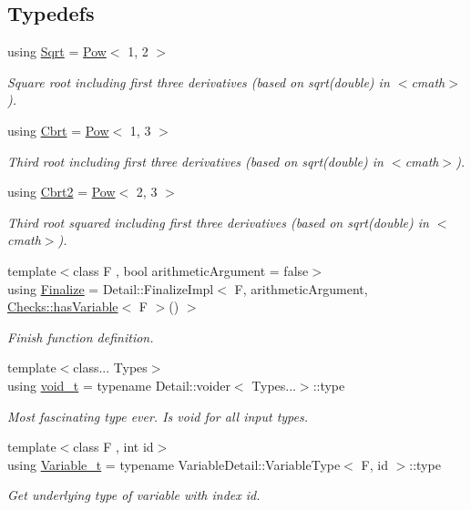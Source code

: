 \subsection*{Typedefs}
\begin{DoxyCompactItemize}
\item 
using \hyperlink{group__CMathGroup_gaca80e773d5886f47cd49dc19b130263f}{Sqrt} = \hyperlink{structFunG_1_1Pow}{Pow}$<$ 1, 2 $>$
\begin{DoxyCompactList}\small\item\em Square root including first three derivatives (based on sqrt(double) in $<$cmath$>$). \end{DoxyCompactList}\item 
using \hyperlink{group__CMathGroup_ga2e4363ad8400e1c8431c10de2152ec2b}{Cbrt} = \hyperlink{structFunG_1_1Pow}{Pow}$<$ 1, 3 $>$
\begin{DoxyCompactList}\small\item\em Third root including first three derivatives (based on sqrt(double) in $<$cmath$>$). \end{DoxyCompactList}\item 
using \hyperlink{group__CMathGroup_ga9bcbef859d7ffd0d6570d69e1bd8503a}{Cbrt2} = \hyperlink{structFunG_1_1Pow}{Pow}$<$ 2, 3 $>$
\begin{DoxyCompactList}\small\item\em Third root squared including first three derivatives (based on sqrt(double) in $<$cmath$>$). \end{DoxyCompactList}\item 
{\footnotesize template$<$class F , bool arithmetic\+Argument = false$>$ }\\using \hyperlink{namespaceFunG_ab2a52dfbc62e262c67f293fda5f81ef7}{Finalize} = Detail\+::\+Finalize\+Impl$<$ F, arithmetic\+Argument, \hyperlink{namespaceFunG_1_1Checks_a6d289274975a662346a1b5adf0d31f37}{Checks\+::has\+Variable}$<$ F $>$() $>$
\begin{DoxyCompactList}\small\item\em Finish function definition. \end{DoxyCompactList}\item 
{\footnotesize template$<$class... Types$>$ }\\using \hyperlink{namespaceFunG_a0cde667596590eb8d32e4a5ee76ddbb9}{void\+\_\+t} = typename Detail\+::voider$<$ Types...$>$\+::type
\begin{DoxyCompactList}\small\item\em Most fascinating type ever. Is void for all input types. \end{DoxyCompactList}\item 
{\footnotesize template$<$class F , int id$>$ }\\using \hyperlink{namespaceFunG_a3d589ef7d011a46a72847eabcbbb4532}{Variable\+\_\+t} = typename Variable\+Detail\+::\+Variable\+Type$<$ F, id $>$\+::type
\begin{DoxyCompactList}\small\item\em Get underlying type of variable with index id. \end{DoxyCompactList}\end{DoxyCompactItemize}
